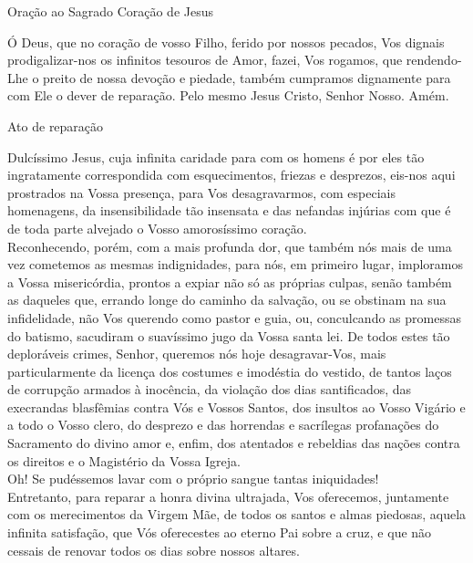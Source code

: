 \begin{center}
    Oração ao Sagrado Coração de Jesus
\end{center}
\begin{flushleft}
    Ó Deus, que no coração de vosso Filho, ferido por nossos pecados, Vos dignais prodigalizar-nos os infinitos tesouros de Amor, fazei, Vos rogamos, que rendendo-Lhe o preito de nossa devoção e piedade, também cumpramos dignamente para com Ele o dever de reparação. Pelo mesmo Jesus Cristo, Senhor Nosso. Amém.
\end{flushleft}
\begin{center}
    Ato de reparação
\end{center}
\begin{flushleft}
    Dulcíssimo Jesus, cuja infinita caridade para com os homens é por eles tão ingratamente correspondida com esquecimentos, friezas e desprezos, eis-nos aqui prostrados na Vossa presença, para Vos desagravarmos, com especiais homenagens, da insensibilidade tão insensata e das nefandas injúrias com que é de toda parte alvejado o Vosso amorosíssimo coração.
    \vspace{.2cm} \\
    Reconhecendo, porém, com a mais profunda dor, que também nós mais de uma vez cometemos as mesmas indignidades, para nós, em primeiro lugar, imploramos a Vossa misericórdia, prontos a expiar não só as próprias culpas, senão também as daqueles que, errando longe do caminho da salvação, ou se obstinam na sua infidelidade, não Vos querendo como pastor e guia, ou, conculcando as promessas do batismo, sacudiram o suavíssimo jugo da Vossa santa lei.
    \newpage
    De todos estes tão deploráveis crimes, Senhor, queremos nós hoje desagravar-Vos, mais particularmente da licença dos costumes e imodéstia do vestido, de tantos laços de corrupção armados à inocência, da violação dos dias santificados, das execrandas blasfêmias contra Vós e Vossos Santos, dos insultos ao Vosso Vigário e a todo o Vosso clero, do desprezo e das horrendas e sacrílegas profanações do Sacramento do divino amor e, enfim, dos atentados e rebeldias das nações contra os direitos e o Magistério da Vossa Igreja.
    \vspace{.2cm} \\
    Oh! Se pudéssemos lavar com o próprio sangue tantas iniquidades!
    \vspace{.2cm} \\
    Entretanto, para reparar a honra divina ultrajada, Vos oferecemos, juntamente com os merecimentos da Virgem Mãe, de todos os santos e almas piedosas, aquela infinita satisfação, que Vós oferecestes ao eterno Pai sobre a cruz, e que não cessais de renovar todos os dias sobre nossos altares.

\end{flushleft}
